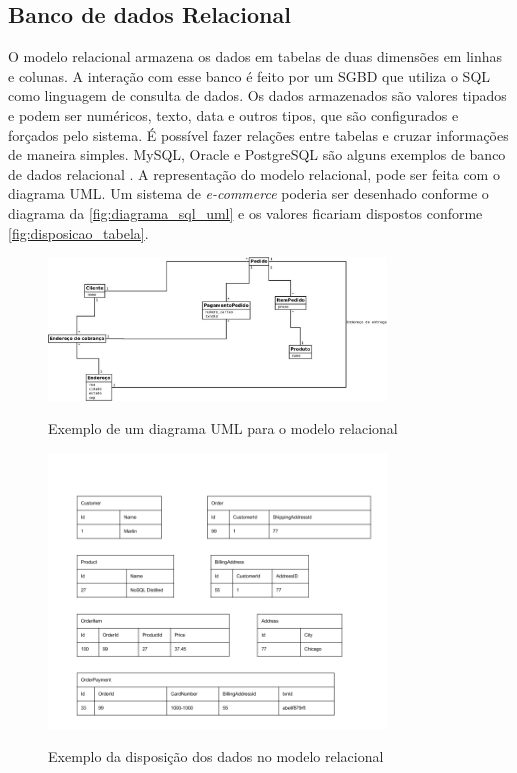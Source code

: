\subsection{Banco de dados Relacional}
\label{subsec:relationaldatabasetype}
O modelo relacional armazena os dados em tabelas de duas dimensões em linhas e colunas. A interação com esse banco é feito por um \ac{SGBD} que utiliza o \ac{SQL} como linguagem de consulta de dados. Os dados armazenados são valores tipados e podem ser numéricos, texto, data e outros tipos, que são configurados e forçados pelo sistema. É possível fazer relações entre tabelas e cruzar informações de maneira simples. MySQL, Oracle e PostgreSQL são alguns exemplos de banco de dados relacional \cite{SDSW}.
A representação do modelo relacional, pode ser feita com o diagrama \ac{UML}. Um sistema de \textit{e-commerce} poderia ser desenhado conforme o diagrama da \autoref{fig:diagrama_sql_uml} e os valores ficariam dispostos conforme \autoref{fig:disposicao_tabela}.
\begin{figure}[H]
    \centering
    \caption{Exemplo de um diagrama \ac{UML} para o modelo relacional}
    \includegraphics[width=0.8\textwidth]{./04-figuras/diagrama_sql_uml.jpg}
    \label{fig:diagrama_sql_uml}
\end{figure}
\begin{figure}[H]
    \centering
    \caption{Exemplo da disposição dos dados no modelo relacional}
    \includegraphics[width=0.8\textwidth]{./04-figuras/disposicao_dados_tabela.png}
    \label{fig:disposicao_tabela}
\end{figure}


